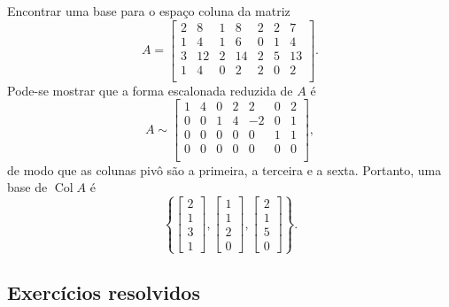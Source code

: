 \begin{ex}
	Encontrar uma base para o espaço coluna da matriz
	\begin{equation}
	A = \left[
	\begin{array}{ccccccc}
		2  & 8  & 1  & 8 & 2 & 2 & 7  \\
	1  & 4  & 1  & 6 & 0 & 1 & 4  \\
	3  & 12 & 2  & 14 & 2 & 5 & 13  \\
	1  & 4  & 0  & 2 & 2 & 0 & 2  \\
	\end{array}
	\right].
	\end{equation} Pode-se mostrar que a forma escalonada reduzida de $A$ é
	\begin{equation}
	A \sim
	\left[
	\begin{array}{ccccccc}
	1  & 4  & 0  & 2 & 2 & 0 & 2  \\
	0  & 0  & 1  & 4 & -2& 0 & 1  \\
	0  & 0  & 0  & 0 & 0 & 1 & 1  \\
	0  & 0  & 0  & 0 & 0 & 0 & 0  \\
	\end{array}
	\right],
	\end{equation} de modo que as colunas pivô são a primeira, a terceira e a sexta. Portanto, uma base de $\operatorname{Col} A$ é
	\begin{equation}
	\left\{
	\left[
	\begin{array}{c}
	2    \\
	1  \\
	3    \\
	1
	\end{array}
	\right],
	\left[
	\begin{array}{c}
	1   \\
	1   \\
	2   \\
	0
	\end{array}
	\right],
	\left[
	\begin{array}{c}
	2  \\
	1 \\
	5  \\
	0
	\end{array}
	\right]
	\right\}.
	\end{equation}
\end{ex}

\subsection*{Exercícios resolvidos}

